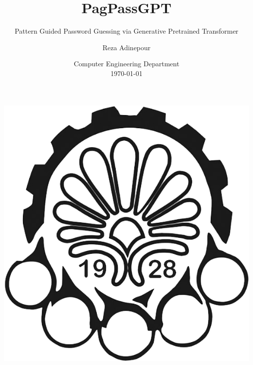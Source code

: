 \documentclass[
	12pt, %
]{beamer}
\title[PagPassGPT]{PagPassGPT} %
\subtitle{Pattern Guided Password Guessing
	via Generative Pretrained Transformer} %
\author[Reza Adinepour]{Reza Adinepour} %
\institute[AUT]{Amirkabir University of Technology\\ (Tehran Polytechnic) \\ \smallskip } %
\date[\today]{Computer Engineering Department \\ \today} %
\begin{document}

\begin{frame}
	\titlepage %
	\centering\includegraphics[scale=0.12]{Images/Logo/logo2.png}
\end{frame}


\end{document}
